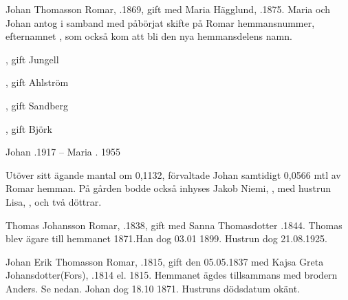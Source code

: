 Johan Thomasson Romar, .1869, gift med Maria Hägglund, .1875. Maria och Johan antog i samband med påbörjat skifte på Romar hemmansnummer, efternamnet , som också kom att bli den nya hemmansdelens namn.
\begin{jhchildren}
  \item {}
  \item {}, gift Jungell
  \item {}, gift Ahlström
  \item {}, gift Sandberg
  \item {}
  \item {}, gift Björk
\end{jhchildren}

Johan .1917  --  Maria . 1955

Utöver sitt ägande mantal om 0,1132, förvaltade Johan samtidigt 0,0566 mtl av Romar hemman. På gården bodde också inhyses Jakob Niemi, , med hustrun Lisa, , och två döttrar.


Thomas Johansson Romar, .1838, gift med Sanna Thomasdotter .1844.
Thomas blev ägare till hemmanet 1871.Han dog 03.01 1899. Hustrun dog 21.08.1925.
\begin{jhchildren}
  \item {}
  \item {}
  \item {}
  \item {}
  \item {}
  \item {}
  \item {}
  \item {}
\end{jhchildren}


Johan Erik Thomasson Romar, .1815, gift den 05.05.1837 med Kajsa Greta Johansdotter(Fors), .1814 el. 1815.
Hemmanet ägdes tillsammans med brodern Anders. Se nedan. Johan dog 18.10 1871. Hustruns dödsdatum okänt.
\begin{jhchildren}
  \item {}
  \item {}
  \item {}
  \item {}
\end{jhchildren}


